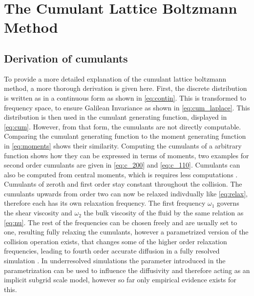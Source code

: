 \chapter{The Cumulant Lattice Boltzmann Method}
\section{Derivation of cumulants}
To provide a more detailed explanation of the cumulant lattice boltzmann method, a more thorough derivation is given here. First, the discrete distribution is written as in a continuous form as shown in \eqref{eq:contin}. This is transformed to frequency space, to ensure Galilean Invariance as shown in \eqref{eq:cum_laplace}. This distribution is then used in the cumulant generating function, displayed in \eqref{eq:cum}. However, from that form, the cumulants are not directly computable. Comparing the cumulant generating function to the moment generating function in \eqref{eq:moments} shows their similarity. Computing the cumulants of a arbitrary function shows how they can be expressed in terms of moments, two examples for second order cumulants are given in \eqref{eq:c_200} and \eqref{eq:c_110}. Cumulants can also be computed from central moments, which is requires less computations \cite{geier_cumulant_2015}. Cumulants of zeroth and first order stay constant throughout the collision. The cumulants upwards from order two can now be relaxed indivdually like \eqref{eq:relax}, therefore each has its own relaxation frequency. The first frequency $\omega_1$ governs the shear viscosity and $\omega_2$ the bulk viscosity of the fluid by the same relation as \eqref{eq:nu}. The rest of the frequencies can be chosen freely and are usually set to one, resulting fully relaxing the cumulants, however a parametrized version of the collision operation exists, that changes some of the higher order relaxation frequencies, leading to fourth order accurate diffusion in a fully resolved simulation \cite{geier_parametrization_2017}. In underresolved simulations the parameter introduced in the parametrization can be used to influence the diffusivity and therefore acting as an implicit subgrid scale model, however so far only empirical evidence exists for this.\cite{geier_cumulant_2015} 
